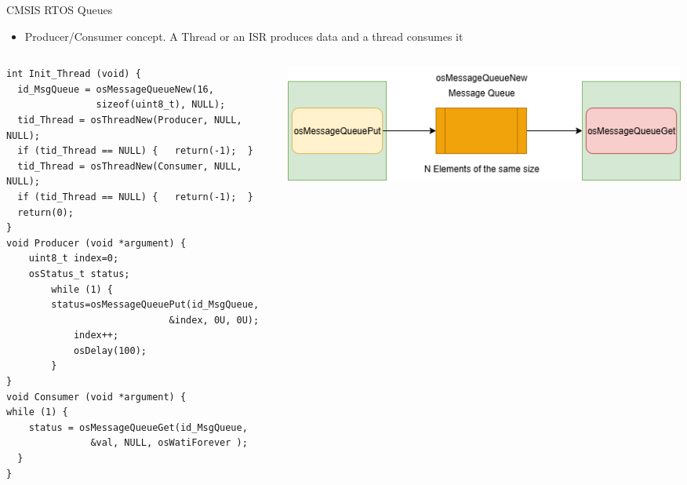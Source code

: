 \begin{frame}[fragile]{CMSIS RTOS Queues}
\begin{itemize}
    \item Producer/Consumer concept. A Thread or an ISR produces data and a thread consumes it
\end{itemize}
\begin{columns}
  \begin{column}{0.45\textwidth}
    \begin{verbatim}
int Init_Thread (void) {
  id_MsgQueue = osMessageQueueNew(16,
                sizeof(uint8_t), NULL);
  tid_Thread = osThreadNew(Producer, NULL, NULL);
  if (tid_Thread == NULL) {   return(-1);  }
  tid_Thread = osThreadNew(Consumer, NULL, NULL);
  if (tid_Thread == NULL) {   return(-1);  }
  return(0);
}
void Producer (void *argument) {
    uint8_t index=0;
    osStatus_t status;
        while (1) {
        status=osMessageQueuePut(id_MsgQueue,
                             &index, 0U, 0U);
        	index++;
        	osDelay(100);
        }
}
void Consumer (void *argument) {
while (1) {
	status = osMessageQueueGet(id_MsgQueue,
               &val, NULL, osWatiForever );
  }
}

    \end{verbatim}
    \end{column}
    \begin{column}{0.55\textwidth}
     \includegraphics[scale=0.35]{presentation/queues.drawio.png}
    \end{column}
\end{columns}
\end{frame}

